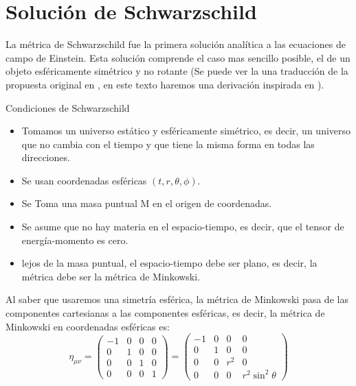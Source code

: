 \section{Solución de Schwarzschild}
\label{sec:solucionSchwarzschild}
\noindent La métrica de Schwarzschild fue la primera solución analítica a las ecuaciones de campo de Einstein. Esta solución comprende el caso mas sencillo posible, el de un objeto esféricamente simétrico y no rotante (Se puede ver la una traducción de la propuesta original en \cite{schwarzschild1999gravitationalfieldmasspoint}, en este texto haremos una derivación inspirada en \cite{eigenchris-2021}).
\begin{definition}{Condiciones de Schwarzschild}{}
    \begin{itemize}
        \item Tomamos un universo estático y esféricamente simétrico, es decir, un universo que no cambia con el tiempo y que tiene la misma forma en todas las direcciones.
        \item Se usan coordenadas esféricas $(t,r,\theta,\phi)$.
        \item Se Toma una masa puntual M en el origen de coordenadas.
        \item Se asume que no hay materia en el espacio-tiempo, es decir, que el tensor de energía-momento es cero.
        \item lejos de la masa puntual, el espacio-tiempo debe ser plano, es decir, la métrica debe ser la métrica de Minkowski.
    \end{itemize}
\end{definition}
Al saber que usaremos una simetría esférica, la métrica de Minkowski pasa de las componentes cartesianas a las componentes esféricas, es decir, la métrica de Minkowski en coordenadas esféricas es:
\begin{equation}
    \eta_{\mu \nu}=\left(\begin{array}{cccc}
            -1 & 0 & 0 & 0 \\
            0  & 1 & 0 & 0 \\
            0  & 0 & 1 & 0 \\
            0  & 0 & 0 & 1
        \end{array}\right)=\left(\begin{array}{cccc}
            -1 & 0 & 0     & 0                      \\
            0  & 1 & 0     & 0                      \\
            0  & 0 & r^{2} & 0                      \\
            0  & 0 & 0     & r^{2} \sin ^{2} \theta
        \end{array}\right)
\end{equation}
